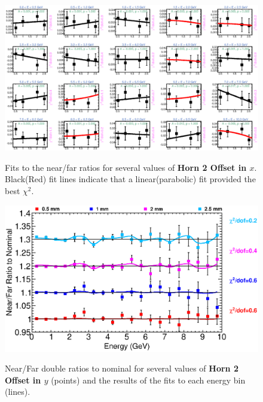 {\begin{figure}[ht]
  \begin{center}
    {\includegraphics[width=5.0in]{figures/Horn2XOffset_nof_fits.eps}}
  \end{center}
\caption{ Fits to the near/far ratios for several values of {\bf Horn 2 Offset in $x$}. Black(Red) fit lines indicate that a linear(parabolic) fit provided the best $\chi^2$. }
\end{figure}

\begin{figure}[ht]
  \begin{center}
    {\includegraphics[width=6.0in]{figures/Horn2YOffset_nof_summary.eps}}
  \end{center}
\caption{ Near/Far double ratios to nominal for several values of {\bf Horn 2 Offset in $y$} (points) and the results of the fits to each energy bin (lines).}
\end{figure}

}
